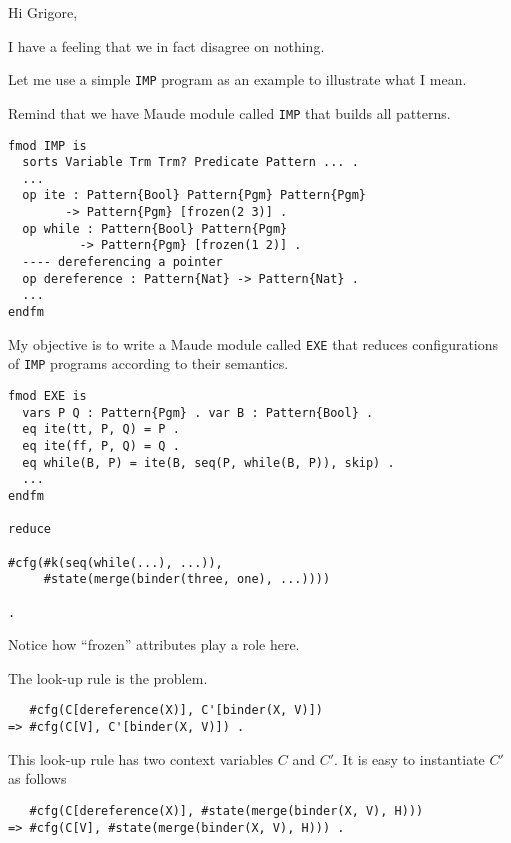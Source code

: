 \documentclass{article}
\begin{document}
Hi Grigore,

I have a feeling that we in fact disagree on nothing. 

Let me use a simple \texttt{IMP} program as an example to illustrate what I mean. 

Remind that we have Maude module called \texttt{IMP} that builds all patterns. 


\lstset{style=code}

\begin{lstlisting}
fmod IMP is
  sorts Variable Trm Trm? Predicate Pattern ... .
  ...
  op ite : Pattern{Bool} Pattern{Pgm} Pattern{Pgm} 
        -> Pattern{Pgm} [frozen(2 3)] .
  op while : Pattern{Bool} Pattern{Pgm} 
          -> Pattern{Pgm} [frozen(1 2)] .
  ---- dereferencing a pointer
  op dereference : Pattern{Nat} -> Pattern{Nat} . 
  ...
endfm

\end{lstlisting}

My objective is to write a Maude module called \texttt{EXE} that reduces configurations of \texttt{IMP} programs according to their semantics. 

\lstset{style=code}

\begin{lstlisting}
fmod EXE is
  vars P Q : Pattern{Pgm} . var B : Pattern{Bool} .
  eq ite(tt, P, Q) = P .
  eq ite(ff, P, Q) = Q .
  eq while(B, P) = ite(B, seq(P, while(B, P)), skip) .
  ...
endfm

reduce

#cfg(#k(seq(while(...), ...)),
     #state(merge(binder(three, one), ...))))
     
.

\end{lstlisting}

Notice how ``frozen'' attributes play a role here.

The look-up rule is the problem. 

\lstset{style=code}

\begin{lstlisting}
   #cfg(C[dereference(X)], C'[binder(X, V)]) 
=> #cfg(C[V], C'[binder(X, V)]) .
\end{lstlisting}

This look-up rule has two context variables $C$ and $C'$. It is easy to instantiate $C'$ as follows

\lstset{style=code}

\begin{lstlisting}
   #cfg(C[dereference(X)], #state(merge(binder(X, V), H)))
=> #cfg(C[V], #state(merge(binder(X, V), H))) .
\end{lstlisting}
\end{document}
